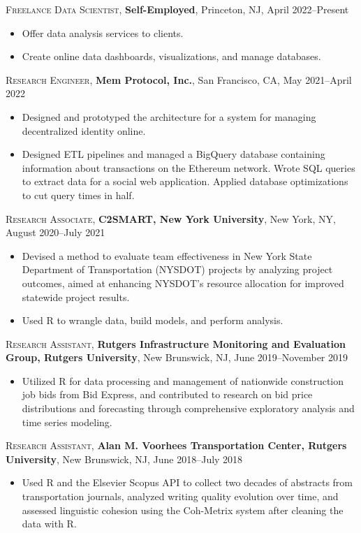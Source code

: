\documentclass[letterpaper,10pt]{article}
\begin{document}
\textsc{Freelance Data Scientist}, \textbf{Self-Employed}, Princeton, NJ, April 2022--Present
\begin{itemize}
  \item Offer data analysis services to clients.
  \item Create online data dashboards, visualizations, and manage databases.
\end{itemize}

\textsc{Research Engineer}, \textbf{Mem Protocol, Inc.}, San Francisco, CA, May 2021--April 2022
\begin{itemize}
  \item Designed and prototyped the architecture for a system for managing decentralized identity online.
  \item Designed ETL pipelines and managed a BigQuery database containing information about transactions on the Ethereum
        network. Wrote SQL queries to extract data for a social web application. Applied database optimizations to cut
        query times in half.
\end{itemize}

\textsc{Research Associate}, \textbf{C2SMART, New York University}, New York, NY, August 2020--July 2021
\begin{itemize}
  \item Devised a method to evaluate team effectiveness in New York State Department of Transportation (NYSDOT) projects
        by analyzing project outcomes, aimed at enhancing NYSDOT's resource allocation for improved statewide project
        results.
  \item Used R to wrangle data, build models, and perform analysis.
\end{itemize}

\textsc{Research Assistant}, \textbf{Rutgers Infrastructure Monitoring and Evaluation Group, Rutgers University}, New
Brunswick, NJ, June 2019--November 2019
\begin{itemize}
  \item Utilized R for data processing and management of nationwide construction job bids from Bid Express, and
        contributed to research on bid price distributions and forecasting through comprehensive exploratory analysis
        and time series modeling.
\end{itemize}

\textsc{Research Assistant}, \textbf{Alan M. Voorhees Transportation Center, Rutgers University}, New Brunswick, NJ,
June 2018--July 2018
\begin{itemize}
  \item Used R and the Elsevier Scopus API to collect two decades of abstracts from transportation journals, analyzed
        writing quality evolution over time, and assessed linguistic cohesion using the Coh-Metrix system after cleaning
        the data with R.
\end{itemize}
\end{document}
